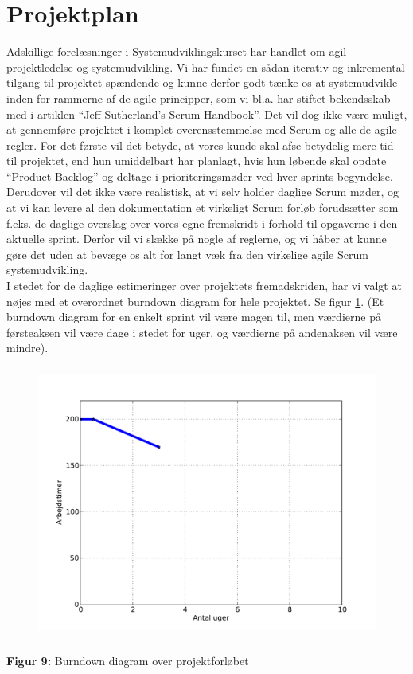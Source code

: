 \documentclass[12pt]{article}   %
\begin{document}
\section{Projektplan}
Adskillige forelæsninger i Systemudviklingskurset har handlet om agil projektledelse og systemudvikling. Vi har fundet en sådan iterativ og inkremental tilgang til projektet spændende og kunne derfor godt tænke os at systemudvikle inden for rammerne af de agile principper, som vi bl.a. har 
stiftet bekendsskab med i artiklen ``Jeff Sutherland's Scrum
Handbook''\cite{scrum}. Det vil dog ikke være muligt, at gennemføre projektet i komplet overensstemmelse med Scrum og alle de agile regler. For det første vil det betyde, at vores kunde skal afse betydelig mere tid til projektet, end hun umiddelbart har planlagt, hvis hun løbende skal opdate ``Product Backlog'' og deltage i prioriteringsmøder ved hver sprints begyndelse. Derudover vil det ikke være realistisk, at vi selv holder daglige Scrum møder,
og at vi kan levere al den dokumentation et virkeligt Scrum forløb
forudsætter som f.eks. de daglige overslag over vores egne fremskridt i forhold
til opgaverne i den aktuelle sprint. Derfor vil vi slække på nogle af 
reglerne, og vi håber at kunne gøre det uden at bevæge os alt for langt væk fra 
den virkelige agile Scrum systemudvikling.\\
I stedet for de daglige estimeringer over projektets fremadskriden, har vi
valgt at nøjes med et overordnet burndown diagram for hele projektet. Se figur
\ref{fig:bd}. (Et burndown diagram for en enkelt sprint vil være magen til,
men værdierne på førsteaksen vil være dage i stedet for uger, og værdierne på
andenaksen vil være mindre). 

\begin{figure}[!ht]
	\centering
\includegraphics[width=13cm, height=9cm]{burn2.pdf}
\label{fig:bd}
\end{figure}
\begin{center}
\textbf{Figur 9:} Burndown diagram over projektforløbet
\end{center}
\end{document}
